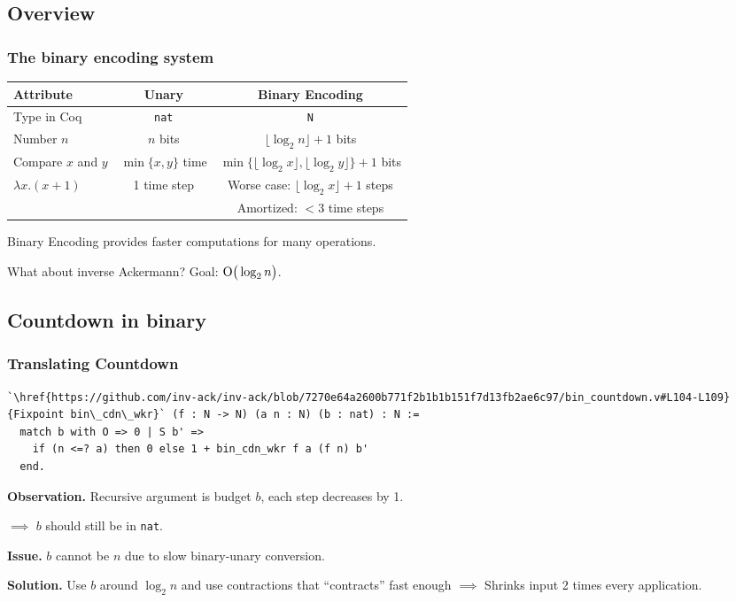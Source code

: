 
\subsection{Overview}

\begin{frame}
\frametitle{The binary encoding system}

\begin{tabular}{l|c|c}
	Attribute & Unary & Binary Encoding \\ \hline
	Type in Coq & \texttt{nat} & \texttt{N} \\[7pt]
	Number $n$ & $n$ bits & $\lfloor \log_2n \rfloor + 1$ bits \\[7pt]
	Compare $x$ and $y$ & $\min\{x, y\}$ time & $\min\{\lfloor \log_2x \rfloor, \lfloor \log_2y \rfloor\} + 1$ bits \\[9pt]
	$\lambda x. (x + 1)$ & 1 time step & Worse case: $\lfloor \log_2x \rfloor + 1$ steps \\
	                     &             & Amortized: $< 3$ time steps \\
	                    
\end{tabular}

\bigskip

Binary Encoding provides faster computations for many operations.

\smallskip

What about inverse Ackermann? Goal: $\text{O} \big(\log_2n\big)$.

\end{frame}


\subsection{Countdown in binary}


\begin{frame}[fragile]
\frametitle{Translating Countdown}

\begin{lstlisting}
`\href{https://github.com/inv-ack/inv-ack/blob/7270e64a2600b771f2b1b1b151f7d13fb2ae6c97/bin_countdown.v#L104-L109}{Fixpoint bin\_cdn\_wkr}` (f : N -> N) (a n : N) (b : nat) : N :=
  match b with O => 0 | S b' =>
    if (n <=? a) then 0 else 1 + bin_cdn_wkr f a (f n) b'
  end.
\end{lstlisting}

\bigskip

\textbf{Observation.} Recursive argument is budget $b$, each step decreases by 1.

$\implies$ $b$ should still be in \texttt{nat}.

\bigskip

\textbf{Issue.} $b$ cannot be $n$ due to slow binary-unary conversion.

\bigskip

\textbf{Solution.} Use $b$ around $\log_2n$ and use contractions that ``contracts'' fast enough $\implies$ Shrinks input 2 times every application.
\end{frame}



